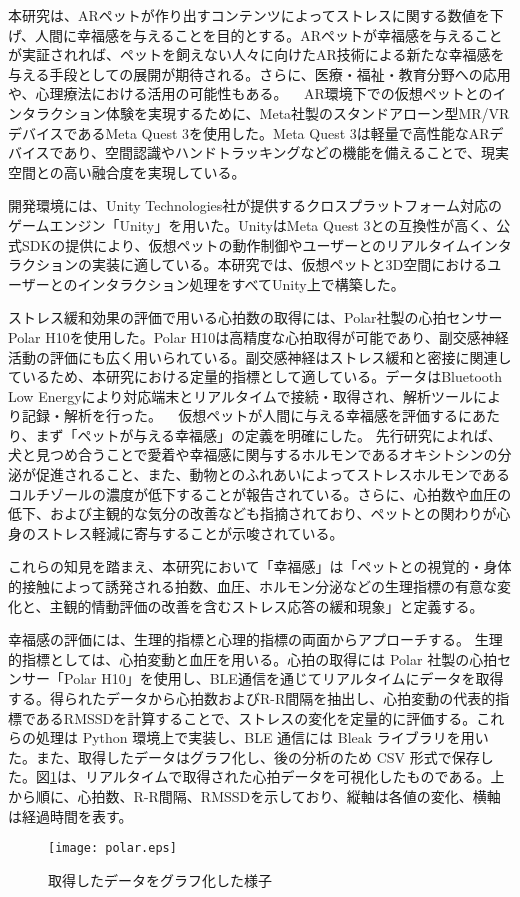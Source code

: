 \documentclass[a4j]{ltjsarticle}
\newcounter{seccnt}
\newcommand{\usection}[1]{\ \newline{\bf\underline{\theseccnt\stepcounter{seccnt}. #1}\hspace{10pt}}}
\begin{document}
本研究は、ARペットが作り出すコンテンツによってストレスに関する数値を下げ、人間に幸福感を与えることを目的とする。ARペットが幸福感を与えることが実証されれば、ペットを飼えない人々に向けたAR技術による新たな幸福感を与える手段としての展開が期待される。さらに、医療・福祉・教育分野への応用や、心理療法における活用の可能性もある。
\usection{関連技術}
AR環境下での仮想ペットとのインタラクション体験を実現するために、Meta社製のスタンドアローン型MR/VRデバイスであるMeta Quest 3を使用した。Meta Quest 3は軽量で高性能なARデバイスであり、空間認識やハンドトラッキングなどの機能を備えることで、現実空間との高い融合度を実現している。

開発環境には、Unity Technologies社が提供するクロスプラットフォーム対応のゲームエンジン「Unity」を用いた。UnityはMeta Quest 3との互換性が高く、公式SDKの提供により、仮想ペットの動作制御やユーザーとのリアルタイムインタラクションの実装に適している。本研究では、仮想ペットと3D空間におけるユーザーとのインタラクション処理をすべてUnity上で構築した。

ストレス緩和効果の評価で用いる心拍数の取得には、Polar社製の心拍センサーPolar H10を使用した。Polar H10は高精度な心拍取得が可能であり、副交感神経活動の評価にも広く用いられている。副交感神経はストレス緩和と密接に関連しているため、本研究における定量的指標として適している。データはBluetooth Low Energyにより対応端末とリアルタイムで接続・取得され、解析ツールにより記録・解析を行った。
\usection{研究の経緯}
仮想ペットが人間に与える幸福感を評価するにあたり、まず「ペットが与える幸福感」の定義を明確にした。
先行研究によれば、犬と見つめ合うことで愛着や幸福感に関与するホルモンであるオキシトシンの分泌が促進されること\cite{1}、また、動物とのふれあいによってストレスホルモンであるコルチゾールの濃度が低下すること\cite{2}が報告されている。さらに、心拍数や血圧の低下\cite{3}、および主観的な気分の改善なども指摘されており、ペットとの関わりが心身のストレス軽減に寄与することが示唆されている。

これらの知見を踏まえ、本研究において「幸福感」は「ペットとの視覚的・身体的接触によって誘発される拍数、血圧、ホルモン分泌などの生理指標の有意な変化と、主観的情動評価の改善を含むストレス応答の緩和現象」と定義する。

幸福感の評価には、生理的指標と心理的指標の両面からアプローチする。
生理的指標としては、心拍変動と血圧を用いる。心拍の取得には Polar 社製の心拍センサー「Polar H10」を使用し、BLE通信を通じてリアルタイムにデータを取得する。得られたデータから心拍数およびR-R間隔を抽出し、心拍変動の代表的指標であるRMSSDを計算することで、ストレスの変化を定量的に評価する。これらの処理は Python 環境上で実装し、BLE 通信には Bleak ライブラリを用いた。また、取得したデータはグラフ化し、後の分析のため CSV 形式で保存した。図\ref{fig:polar}は、リアルタイムで取得された心拍データを可視化したものである。上から順に、心拍数、R-R間隔、RMSSDを示しており、縦軸は各値の変化、横軸は経過時間を表す。
\begin{figure}[b]
  \centering
  \texttt{[image: polar.eps]}
  \caption{取得したデータをグラフ化した様子}
  \label{fig:polar}
\end{figure}
\end{document}
